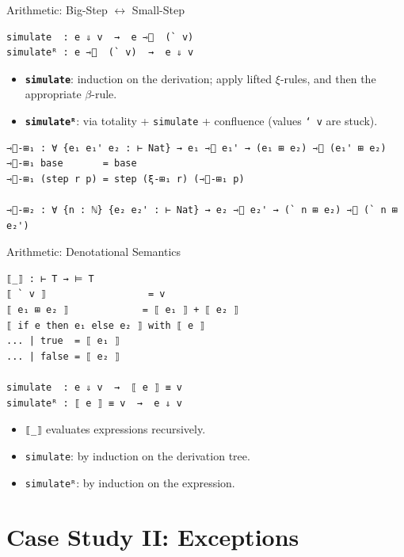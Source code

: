 \documentclass[10pt,compress,aspectratio=169]{beamer}
\begin{document}
\begin{frame}[fragile]{Arithmetic: Big-Step $\leftrightarrow$ Small-Step}
\begin{verbatim}
simulate  : e ⇓ v  →  e ⇾⃰  (` v)
simulateᴿ : e ⇾⃰  (` v)  →  e ⇓ v
\end{verbatim}
\begin{itemize}
    \item \textbf{\texttt{simulate}}: induction on the derivation; apply lifted $\xi$-rules, and then the appropriate $\beta$-rule.
    \item \textbf{\texttt{simulateᴿ}}: via totality + \texttt{simulate} + confluence (values \texttt{` v} are stuck).
\end{itemize}

\begin{verbatim}
⇾⃰-⊞₁ : ∀ {e₁ e₁' e₂ : ⊢ Nat} → e₁ ⇾⃰ e₁' → (e₁ ⊞ e₂) ⇾⃰ (e₁' ⊞ e₂)
⇾⃰-⊞₁ base       = base
⇾⃰-⊞₁ (step r p) = step (ξ-⊞₁ r) (⇾⃰-⊞₁ p)

⇾⃰-⊞₂ : ∀ {n : ℕ} {e₂ e₂' : ⊢ Nat} → e₂ ⇾⃰ e₂' → (` n ⊞ e₂) ⇾⃰ (` n ⊞ e₂')
\end{verbatim}


\end{frame}

\begin{frame}[fragile]{Arithmetic: Denotational Semantics}
\begin{verbatim}
⟦_⟧ : ⊢ T → ⊨ T
⟦ ` v ⟧                  = v
⟦ e₁ ⊞ e₂ ⟧             = ⟦ e₁ ⟧ + ⟦ e₂ ⟧
⟦ if e then e₁ else e₂ ⟧ with ⟦ e ⟧
... | true  = ⟦ e₁ ⟧
... | false = ⟦ e₂ ⟧

simulate  : e ⇓ v  →  ⟦ e ⟧ ≡ v
simulateᴿ : ⟦ e ⟧ ≡ v  →  e ⇓ v
\end{verbatim}
\begin{itemize}
    \item \texttt{⟦\_⟧} evaluates expressions recursively.
    \item \texttt{simulate}: by induction on the derivation tree.
    \item \texttt{simulateᴿ}: by induction on the expression.
\end{itemize}
\end{frame}

\section{Case Study II: Exceptions}
\end{document}
